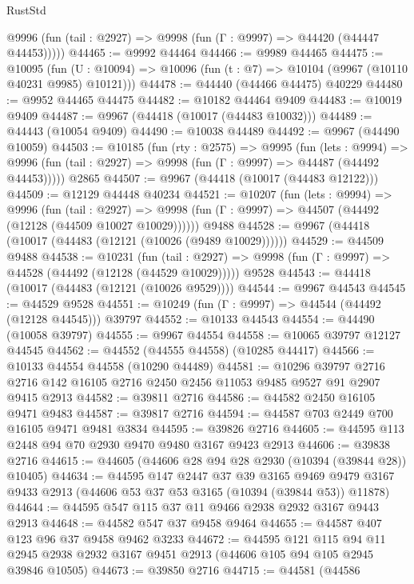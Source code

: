 \begin{lexlean}{RustStd}
\begin{coremodule}
      @9996 (fun (tail : @2927) => @9998 (fun (Γ : @9997) => @44420 (@44447 @44453)))))
@44465 := @9992 @44464
@44466 := @9989 @44465
@44475 := @10095
    (fun (U : @10094) => @10096 (fun (t : @7) => @10104 (@9967 (@10110 @40231 @9985) @10121)))
@44478 := @44440 (@44466 @44475) @40229
@44480 := @9952 @44465 @44475
@44482 := @10182 @44464 @9409
@44483 := @10019 @9409
@44487 := @9967 (@44418 (@10017 (@44483 @10032)))
@44489 := @44443 (@10054 @9409)
@44490 := @10038 @44489
@44492 := @9967 (@44490 @10059)
@44503 := @10185
    (fun (rty : @2575) =>
    @9995
      (fun (lets : @9994) =>
      @9996 (fun (tail : @2927) => @9998 (fun (Γ : @9997) => @44487 (@44492 @44453)))))
    @2865
@44507 := @9967 (@44418 (@10017 (@44483 @12122)))
@44509 := @12129 @44448 @40234
@44521 := @10207
    (fun (lets : @9994) =>
    @9996
      (fun (tail : @2927) =>
      @9998 (fun (Γ : @9997) => @44507 (@44492 (@12128 (@44509 @10027 @10029))))))
    @9488
@44528 := @9967 (@44418 (@10017 (@44483 (@12121 (@10026 (@9489 @10029))))))
@44529 := @44509 @9488
@44538 := @10231
    (fun (tail : @2927) => @9998 (fun (Γ : @9997) => @44528 (@44492 (@12128 (@44529 @10029)))))
    @9528
@44543 := @44418 (@10017 (@44483 (@12121 (@10026 @9529))))
@44544 := @9967 @44543
@44545 := @44529 @9528
@44551 := @10249 (fun (Γ : @9997) => @44544 (@44492 (@12128 @44545))) @39797
@44552 := @10133 @44543
@44554 := @44490 (@10058 @39797)
@44555 := @9967 @44554
@44558 := @10065 @39797 @12127 @44545
@44562 := @44552 (@44555 @44558) (@10285 @44417)
@44566 := @10133 @44554 @44558 (@10290 @44489)
@44581 := @10296
    @39797
    @2716
    @2716
    @142
    @16105
    @2716
    @2450
    @2456
    @11053
    @9485
    @9527
    @91
    @2907
    @9415
    @2913
@44582 := @39811 @2716
@44586 := @44582 @2450 @16105 @9471 @9483
@44587 := @39817 @2716
@44594 := @44587 @703 @2449 @700 @16105 @9471 @9481 @3834
@44595 := @39826 @2716
@44605 := @44595 @113 @2448 @94 @70 @2930 @9470 @9480 @3167 @9423 @2913
@44606 := @39838 @2716
@44615 := @44605 (@44606 @28 @94 @28 @2930 (@10394 (@39844 @28)) @10405)
@44634 := @44595
    @147
    @2447
    @37
    @39
    @3165
    @9469
    @9479
    @3167
    @9433
    @2913
    (@44606 @53 @37 @53 @3165 (@10394 (@39844 @53)) @11878)
@44644 := @44595 @547 @115 @37 @11 @9466 @2938 @2932 @3167 @9443 @2913
@44648 := @44582 @547 @37 @9458 @9464
@44655 := @44587 @407 @123 @96 @37 @9458 @9462 @3233
@44672 := @44595
    @121
    @115
    @94
    @11
    @2945
    @2938
    @2932
    @3167
    @9451
    @2913
    (@44606 @105 @94 @105 @2945 @39846 @10505)
@44673 := @39850 @2716
@44715 := @44581
    (@44586

\end{coremodule}
\end{lexlean}

